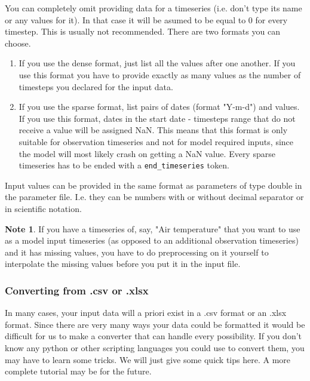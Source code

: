 \documentclass[11pt]{article}
\theoremstyle{definition}
\newtheorem{mynote}{Note}
\newenvironment{note}%
  {\begin{lrbox}{\notebox}%
   \begin{minipage}{\dimexpr\linewidth-2\fboxsep}
   \begin{mynote}}%
  {\end{mynote}%
   \end{minipage}%
   \end{lrbox}%
   \begin{trivlist}
     \item[]\colorbox{silver}{\usebox\notebox}
   \end{trivlist}}
\begin{document}
You can completely omit providing data for a timeseries (i.e. don't type its name or any values for it). In that case it will be asumed to be equal to 0 for every timestep. This is usually not recommended. There are two formats you can choose.
\begin{enumerate}[i]
\item If you use the dense format, just list all the values after one another. If you use this format you have to provide exactly as many values as the number of timesteps you declared for the input data.
\item If you use the sparse format, list pairs of dates (format "Y-m-d") and values. If you use this format, dates in the start date - timesteps range that do not receive a value will be assigned NaN. This means that this format is only suitable for observation timeseries and not for model required inputs, since the model will most likely crash on getting a NaN value. Every sparse timeseries has to be ended with a {\tt end\_timeseries} token.
\end{enumerate}
Input values can be provided in the same format as parameters of type double in the parameter file. I.e. they can be numbers with or without decimal separator or in scientific notation.

\begin{note}
If you have a timeseries of, say, "Air temperature" that you want to use as a model input timeseries (as opposed to an additional observation timeseries) and it has missing values, you have to do preprocessing on it yourself to interpolate the missing values before you put it in the input file.
\end{note}

\subsubsection{Converting from .csv or .xlsx}
In many cases, your input data will a priori exist in a .csv format or an .xlsx format. Since there are very many ways your data could be formatted it would be difficult for us to make a converter that can handle every possibility. If you don't know any python or other scripting languages you could use to convert them, you may have to learn some tricks. We will just give some quick tips here. A more complete tutorial may be for the future.
\end{document}
